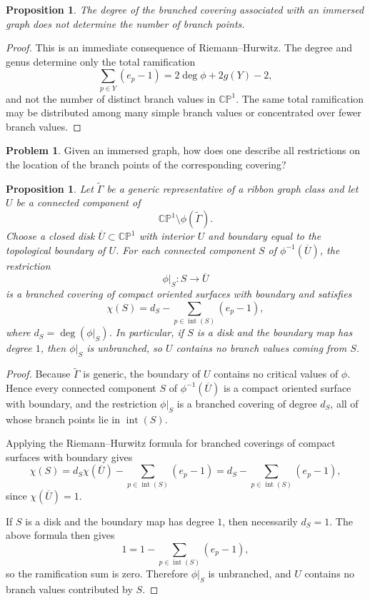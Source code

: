 \documentclass[reqno]{amsart}
\newtheorem{proposition}[theorem]{Proposition}
\theoremstyle{definition}
\newtheorem{problem}[theorem]{Problem}
\newcommand {\Ga}{\Gamma}
\newcommand {\bCP} {\mathbb {CP}}
\begin{document}
\begin{proposition}\label{pr:degbranch}
The degree of the branched covering associated with an immersed graph does not determine the number of branch points.
\end{proposition}

\begin{proof}
This is an immediate consequence of Riemann--Hurwitz. The degree and genus determine only the total ramification
\[
\sum_{p\in Y}(e_p-1)=2\deg\phi+2g(Y)-2,
\]
and not the number of distinct branch values in $\bCP^1$. The same total ramification may be distributed among many simple branch values or concentrated over fewer branch values.
\end{proof}

\begin{problem}
Given an immersed graph, how does one describe all restrictions on the location of the branch points of the corresponding covering?
\end{problem}

\begin{proposition}\label{pr:branchregion}
Let $\widetilde\Ga$ be a generic representative of a ribbon graph class and let $U$ be a connected component of
\[
\bCP^1\setminus \phi(\widetilde\Ga).
\]
Choose a closed disk $\overline U\subset \bCP^1$ with interior $U$ and boundary equal to the topological boundary of $U$. For each connected component $S$ of $\phi^{-1}(\overline U)$, the restriction
\[
\phi|_S:S\to \overline U
\]
is a branched covering of compact oriented surfaces with boundary and satisfies
\[
\chi(S)=d_S-\sum_{p\in \operatorname{int}(S)}(e_p-1),
\]
where $d_S=\deg(\phi|_S)$. In particular, if $S$ is a disk and the boundary map has degree $1$, then $\phi|_S$ is unbranched, so $U$ contains no branch values coming from $S$.
\end{proposition}

\begin{proof}
Because $\widetilde\Ga$ is generic, the boundary of $U$ contains no critical values of $\phi$. Hence every connected component $S$ of $\phi^{-1}(\overline U)$ is a compact oriented surface with boundary, and the restriction $\phi|_S$ is a branched covering of degree $d_S$, all of whose branch points lie in $\operatorname{int}(S)$.

Applying the Riemann--Hurwitz formula for branched coverings of compact surfaces with boundary gives
\[
\chi(S)=d_S\chi(\overline U)-\sum_{p\in \operatorname{int}(S)}(e_p-1)=d_S-\sum_{p\in \operatorname{int}(S)}(e_p-1),
\]
since $\chi(\overline U)=1$.

If $S$ is a disk and the boundary map has degree $1$, then necessarily $d_S=1$. The above formula then gives
\[
1=1-\sum_{p\in \operatorname{int}(S)}(e_p-1),
\]
so the ramification sum is zero. Therefore $\phi|_S$ is unbranched, and $U$ contains no branch values contributed by $S$.
\end{proof}
\end{document}
